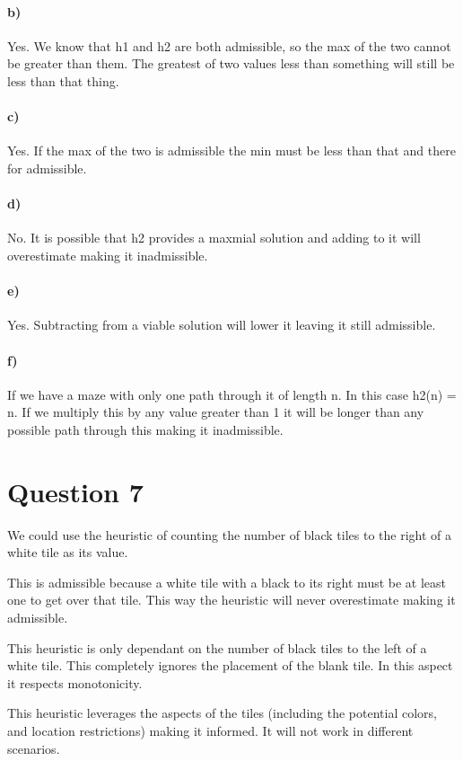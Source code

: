 \documentclass[12pt]{article}
\begin{document}
\paragraph{b)} %
\label{par:paragraph_name}
Yes. We know that h1 and h2 are both admissible, so the max of the two cannot be greater than them. The greatest of two values less than something will still be less than that thing.
\paragraph{c)} %
\label{par:c_}
Yes. If the max of the two is admissible the min must be less than that and there for admissible.
\paragraph{d)} %
\label{par:d_}
No. It is possible that h2 provides a maxmial solution and adding to it will overestimate making it inadmissible.
\paragraph{e)} %
\label{par:e_}
Yes. Subtracting from a viable solution will lower it leaving it still admissible.
\paragraph{f)} %
\label{par:f_}
If we have a maze with only one path through it of length n. In this case h2(n) = n. If we multiply this by any value greater than 1 it will be longer than any possible path through this making it inadmissible.


\section*{Question 7} %
\label{sec:question_7}
We could use the heuristic of counting the number of black tiles to the right of a white tile as its value. 

This is admissible because a white tile with a black to its right must be at least one to get over that tile. This way the heuristic will never overestimate making it admissible. 

This heuristic is only dependant on the number of black tiles to the left of a white tile. This completely ignores the placement of the blank tile. In this aspect it respects monotonicity.

This heuristic leverages the aspects of the tiles (including the potential colors, and location restrictions) making it informed. It will not work in different scenarios.
\end{document}
